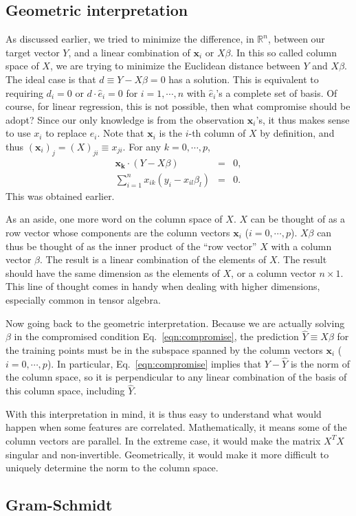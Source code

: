 \subsection{Geometric interpretation}
As discussed earlier, we tried to minimize the difference, in $\mathbb{R}^n$, between our target vector $Y$, and a linear combination of $\mathbf{x}_i$ or $X\beta$. In this so called column space of $X$, we are trying to minimize the Euclidean distance between $Y$ and $X\beta$. The ideal case is that $d\equiv Y-X\beta=0$ has a solution. This is equivalent to requiring $d_i=0$ or $d\cdot \hat e_i=0$ for $i=1,\cdots, n$ with $\hat e_i$'s a complete set of basis. Of course, for linear regression, this is not possible, then what compromise should be adopt? Since our only knowledge is from the observation $\mathbf{x}_i$'s, it thus makes sense to use $x_{i}$ to replace $\hat e_i$. Note that $\mathbf{x}_i$ is the $i$-th column of $X$ by definition, and thus $(\mathbf{x}_i)_j=(X)_{ji}\equiv x_{ji}$. For any $k=0,\cdots,p$,
\begin{eqnarray}
\mathbf{x_k}\cdot(Y-X\beta) &=& 0, \label{eqn:compromise} \\
\sum_{i=1}^{n}x_{ik}(y_i-x_{il}\beta_l) &=& 0.
\end{eqnarray}
This was obtained earlier.

As an aside, one more word on the column space of $X$. $X$ can be thought of as a row vector whose components are the column vectors $\mathbf{x}_i$ ($i=0,\cdots,p$). $X\beta$ can thus be thought of as the inner product of the ``row vector'' $X$ with a column vector $\beta$. The result is a linear combination of the elements of $X$. The result should have the same dimension as the elements of $X$, or a column vector $n\times1$. This line of thought comes in handy when dealing with higher dimensions, especially common in tensor algebra.

Now going back to the geometric interpretation. Because we are actually solving $\beta$ in the compromised condition Eq.~\ref{eqn:compromise}, the prediction $\hat{Y}\equiv X\beta$ for the training points must be in the subspace spanned by the column vectors $\mathbf{x}_i$ ($i=0,\cdots, p$). In particular, Eq.~\ref{eqn:compromise} implies that $Y-\hat{Y}$ is the norm of the column space, so it is perpendicular to any linear combination of the basis of this column space, including $\hat{Y}$.

With this interpretation in mind, it is thus easy to understand what would happen when some features are correlated. Mathematically, it means some of the column vectors are parallel. In the extreme case, it would make the matrix $X^TX$ singular and non-invertible. Geometrically, it would make it more difficult to uniquely determine the norm to the column space.
\subsection{Gram-Schmidt}


